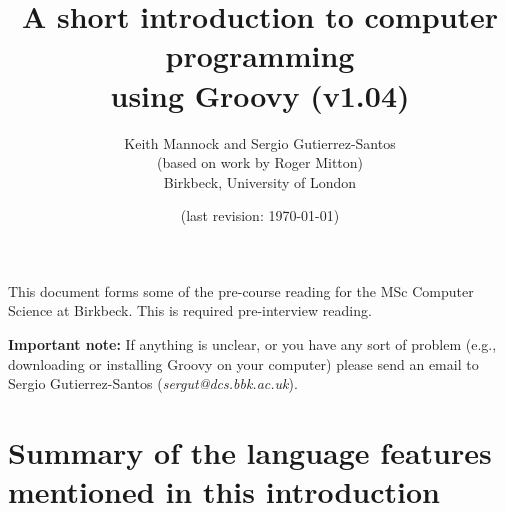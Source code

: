 \documentclass[11pt,a4paper]{article}
\title{A short introduction to computer programming\\
  using Groovy (v1.04)}
\author{Keith Mannock and Sergio Gutierrez-Santos\\(based on work by
  Roger Mitton)\\
Birkbeck, University of London}
\date{(last revision: \today)}
\begin{document}
\maketitle



\noindent This document forms some of the pre-course reading for the
MSc Computer Science at Birkbeck. This is required pre-interview reading. 

\textbf{Important note: }If anything is unclear, or you have any 
sort of problem (e.g.,
downloading or installing Groovy on your computer) please send an
email to Sergio Gutierrez-Santos (\emph{sergut@dcs.bbk.ac.uk}).


\newpage

\newpage

\newpage

\newpage

\newpage

\newpage
\section{Summary of the language features mentioned in this introduction}

\newpage

\end{document}
